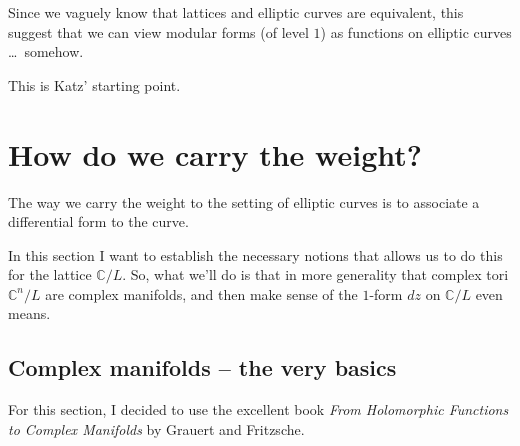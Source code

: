 \documentclass{article}
\theoremstyle{definition}
\begin{document}
Since we vaguely know that lattices and elliptic curves are equivalent, this suggest that we can view modular forms (of level $1$) as functions on elliptic curves \ldots\ somehow.

This is Katz' starting point.
\section{How do we carry the weight?}
The way we carry the weight to the setting of elliptic curves is to associate a differential form to the curve.

In this section I want to establish the necessary notions that allows us to do this for the lattice $\mathbb{C}/L$. So, what we'll do is that in more generality that complex tori $\mathbb{C}^n/L$ are complex manifolds, and then make sense of the $1$-form $dz$ on $\mathbb{C}/L$ even means.
\subsection{Complex manifolds -- the very basics}
For this section, I decided to use the excellent book {\it From Holomorphic Functions to Complex Manifolds} by Grauert and Fritzsche.
\end{document}
